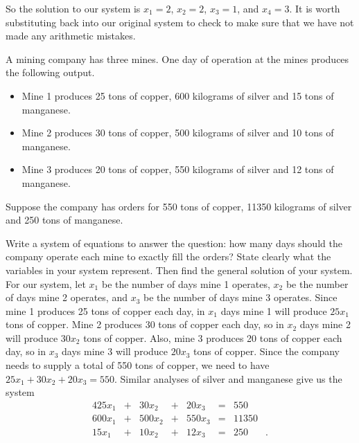 \begin{example}
So the solution to our system is $x_1 =2$, $x_2 = 2$, $x_3 = 1$, and $x_4 =3$. It is worth substituting back into our original system to check to make sure that we have not made any arithmetic mistakes. 
\end{example}

\begin{example} A mining company has three mines. One day of operation at the mines produces the following output.
\begin{itemize}
\item Mine 1 produces 25 tons of copper, 600 kilograms of silver and 15 tons of manganese.
\item Mine 2 produces 30 tons of copper, 500 kilograms of silver and 10 tons of manganese.
\item Mine 3 produces 20 tons of copper, 550 kilograms of silver and 12 tons of manganese.
\end{itemize}
Suppose the company has orders for 550 tons of copper, 11350 kilograms of silver and 250 tons of manganese.

Write a system of equations to answer the question: how many days should the company operate each mine to exactly fill the orders? State clearly what the variables in your system represent. Then find the general solution of your system. \\

	
\ExampleSolution For our system, let $x_1$ be the number of days mine 1 operates, $x_2$ be the number of days mine 2 operates, and $x_3$ be the number of days mine 3 operates. Since mine 1 produces 25 tons of copper each day, in $x_1$ days mine 1 will produce $25x_1$ tons of copper. Mine 2 produces 30 tons of copper each day, so in $x_2$ days mine 2 will produce $30x_2$ tons of copper. Also, mine 3 produces 20 tons of copper each day, so in $x_3$ days mine 3 will produce $20x_3$ tons of copper. Since the company needs to supply a total of 550 tons of copper, we need to have $25x_1+30x_2+20x_3 = 550$. Similar analyses of silver and manganese give us the system
\begin{alignat*}{4}
{25}x_1  	&{}+{}	&{30}x_2	&{}+{} 	&{20}x_3	&{}={} 	&550&{}  \\
{600}x_1  	&{}+{}  &{500}x_2	&{}+{}  &{550}x_3 	&{}={} 	&11350&{}  \\
{15}x_1    	&{}+{}	&{10}x_2  	&{}+{}  &{12}x_3   &{}={}	&250&{.}
 \end{alignat*}  
 

\end{example}
